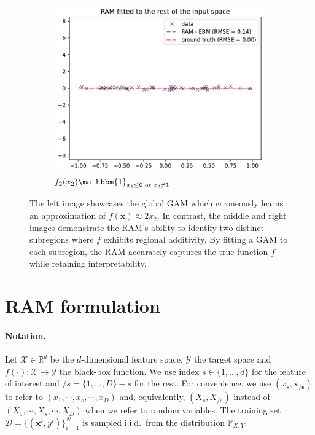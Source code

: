 \documentclass[12pt]{article}
\newcommand{\Rd}{\mathbb{R}^d}
\newcommand{\xb}{\mathbf{x}}
\newcommand{\xcc}{\mathbf{x_{/s}}}
\newcommand{\Xcal}{\mathcal{X}}
\newcommand{\Ycal}{\mathcal{Y}}
\newcommand{\when}[1]{\mathbbm{1}_{#1}}
\begin{document}
\begin{figure}[htbp]
\begin{subfigure}{0.32\textwidth}
    \end{subfigure}
    \begin{subfigure}{0.32\textwidth}
        \centering
        \includegraphics[width=\textwidth]{figures/regional_gam_subreg_2}
        \caption{\(f_2(x_2) \when{x_1 \leq 0 \text{ or } x_3 \neq 1}\)}
        \label{subfig:regional_gam_2}
    \end{subfigure}
    \caption{The left image showcases the global GAM which erroneously learns an approximation of \(f(\xb) \approx 2x_2\).
    In contrast, the middle and right images demonstrate the RAM's ability to identify two distinct subregions where \(f\) exhibits regional additivity.
    By fitting a GAM to each subregion, the RAM accurately captures the true function $f$ while retaining interpretability.}
    \label{fig:ram_example}
\end{figure}


\section{RAM formulation}
\label{sec:ram_formulation}

\paragraph{Notation.}
Let \(\Xcal \in \Rd\) be the \(d\)-dimensional feature space, \(\Ycal\) the target space and \(f(\cdot) : \Xcal \rightarrow \Ycal\) the black-box function.
We use index \(s \in \{1, \ldots, d\}\) for the feature of interest and \(/s = \{1, \ldots, D\} - s\) for the rest.
For convenience, we use \((x_s, \xcc)\) to refer to \((x_1, \cdots , x_s, \cdots, x_D)\) and, equivalently, \((X_s, X_{/s})\) instead of \((X_1, \cdots , X_s, \cdots, X_D)\) when we refer to random variables.
The training set \(\mathcal{D} = \{(\xb^i, y^i)\}_{i=1}^N\) is sampled
i.i.d.\ from the distribution \(\mathbb{P}_{X,Y}\).
\end{document}
